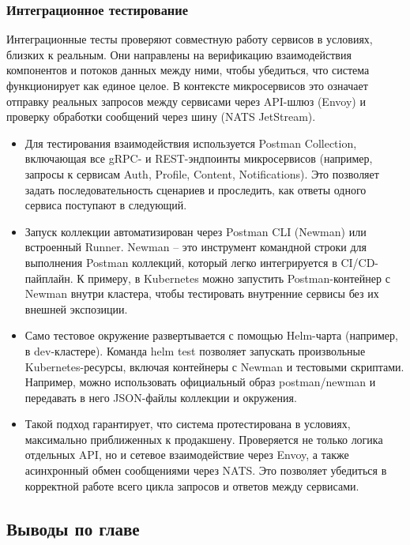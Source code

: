 \subsubsection*{Интеграционное тестирование}
Интеграционные тесты проверяют совместную работу сервисов в условиях, близких к реальным. Они направлены на верификацию взаимодействия компонентов и потоков данных между ними, чтобы убедиться, что система функционирует как единое целое. В контексте микросервисов это означает отправку реальных запросов между сервисами через API-шлюз (Envoy) и проверку обработки сообщений через шину (NATS JetStream).
\begin{itemize}
    \item Для тестирования взаимодействия используется Postman Collection, включающая все gRPC- и REST-эндпоинты микросервисов (например, запросы к сервисам Auth, Profile, Content, Notifications). Это позволяет задать последовательность сценариев и проследить, как ответы одного сервиса поступают в следующий.
    \item Запуск коллекции автоматизирован через Postman CLI (Newman) или встроенный Runner. Newman – это инструмент командной строки для выполнения Postman коллекций, который легко интегрируется в CI/CD-пайплайн. К примеру, в Kubernetes можно запустить Postman-контейнер с Newman внутри кластера, чтобы тестировать внутренние сервисы без их внешней экспозиции.
    \item Само тестовое окружение развертывается с помощью Helm-чарта (например, в dev-кластере). Команда helm test позволяет запускать произвольные Kubernetes-ресурсы, включая контейнеры с Newman и тестовыми скриптами. Например, можно использовать официальный образ postman/newman и передавать в него JSON-файлы коллекции и окружения.
    \item Такой подход гарантирует, что система протестирована в условиях, максимально приближенных к продакшену. Проверяется не только логика отдельных API, но и сетевое взаимодействие через Envoy, а также асинхронный обмен сообщениями через NATS. Это позволяет убедиться в корректной работе всего цикла запросов и ответов между сервисами.
\end{itemize}

\subsection*{Выводы по главе}

